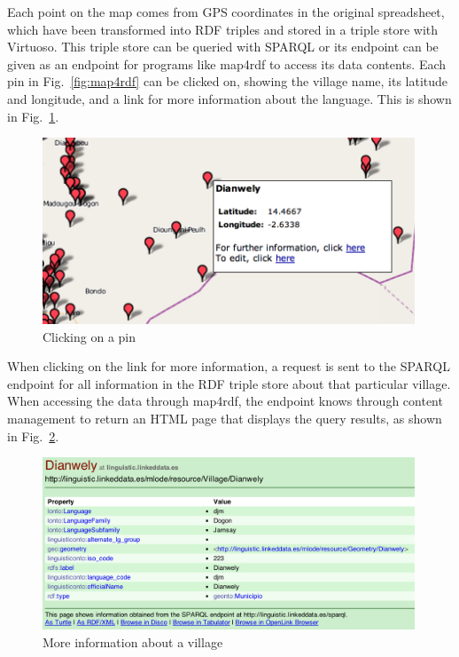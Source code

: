 Each point on the map comes from GPS coordinates in the original spreadsheet, which have been transformed into RDF triples and stored in a triple store with Virtuoso. This triple store can be queried with SPARQL or its endpoint can be given as an endpoint for programs like map4rdf to access its data contents.  Each pin in Fig.\ \ref{fig:map4rdf} can be clicked on, showing the village name, its latitude and longitude, and a link for more information about the language. This is shown in Fig.\ \ref{pin.png}.

\begin{figure}[htb!p]
\centering
\includegraphics[width=0.99\textwidth]{img/pin.png}
\caption{Clicking on a pin}
\label{pin.png}
\end{figure}

When clicking on the link for more information, a request is sent to the SPARQL endpoint for all information in the RDF triple store about that particular village. When accessing the data through map4rdf, the endpoint knows through content management to return an HTML page that displays the query results, as shown in Fig.\ \ref{more_information.png}.

\begin{figure}[htb!p]
\centering
\includegraphics[width=0.99\textwidth]{img/more_information.png}
\caption{More information about a village}
\label{more_information.png}
\end{figure}

